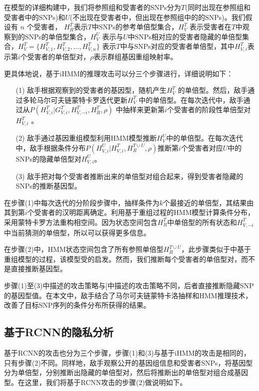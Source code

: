 在模型的详细构建中，我们将参照组和受害者的SNPs分为$T$(同时出现在参照组和受害者中的SNPs)和$U$(不出现在受害者中，但出现在参照组中的的SNPs)。我们假设有 $n$ 个受害者， $H_R^T$表示$T$中SNPs的参考单倍型集合，$H_V^T$ 表示受害者在$T$中观察到的SNPs的单倍型集合，$H_V^U$ 表示与$U$中SNPs相对应的受害者隐藏的单倍型集合，$H_V^T=\{H_{V,1}^T,H_{V,2}^T,..., H_{V,n}^T\}$ 表示$T$中与SNPs对应的受害者单倍型，其中$H_{V,i}^T$表示第$i$个受害者的单倍型对，$\rho$表示群组基因重组映射率。

更具体地说，基于iHMM的推理攻击可以分三个步骤进行，详细说明如下：
\begin{enumerate}
	\item[(1)] 敌手根据观察到的受害者的基因型，随机产生$H_V^T$ 的单倍型。然后，敌手通过多轮马尔可夫链蒙特卡罗迭代更新$H_V^T$ 中的单倍型。在每次迭代中，敌手通过从$P(H_{V,i}^T|G_{V,i}^T,H_{V,-i}^T,H_R^T,\rho)$ 中抽样来更新第$i$个受害者的阶段性单倍型对$H_{V,i}^T$ 。
	\item[(2)] 敌手通过基因重组模型利用HMM模型推断$H_V^U$中的单倍型。在每次迭代中，敌手根据条件分布$P(H_{V,i}^U|H_{V,i}^T, H_R^{T \cup U},\rho)$推断第$i$个受害者对应$U$中的SNPs的隐藏单倍型对$H_{V,i}^U$。 
	\item[(3)] 敌手把对每个受害者推断出来的单倍型对组合起来，得到受害者隐藏的SNPs的推断基因型。
\end{enumerate}

在步骤(1)中每次迭代的分阶段步骤中，抽样条件为$k$个最接近的单倍型，其结果由其到第$i$个受害者的汉明距离确定。利用基于重组过程的HMM模型计算条件分布，采用蒙特卡罗方法重构相空间。因为状态空间包含$H_R^T$中单倍型的所有状态和$H_{V,-i}^T$中当前猜测的单倍型，所以可以获得更多信息。

在步骤(2)中，HMM状态空间包含了所有参照单倍型$H_R^{T \cup U}$，此步骤类似于\cite{samani2015quantifying}中基于重组模型的过程，该模型受\cite{marchini2007new}的启发。然而，我们推断每个受害者的单倍型对，而不是直接推断基因型。

步骤(1)至(3)中描述的攻击策略与[\cite{samani2015quantifying}中描述的攻击策略不同，后者直接推断隐藏SNP的基因型值。在本文中，敌手结合了马尔可夫链蒙特卡洛抽样和HMM推理技术，改善了目标SNP序列的条件分布所获得的结果。

\subsection{基于RCNN的隐私分析}

基于RCNN的攻击也分为三个步骤，步骤(1)和(3)与基于iHMM的攻击是相同的，只有步骤(2)不同。同样地，敌手观察公开的基因组信息和受害者SNPs，将基因型分为单倍型，分别推断出隐藏的单倍型对，然后将推断出的单倍型对组合成基因型。在这里，我们将基于RCNN攻击的步骤(2)做说明如下。


